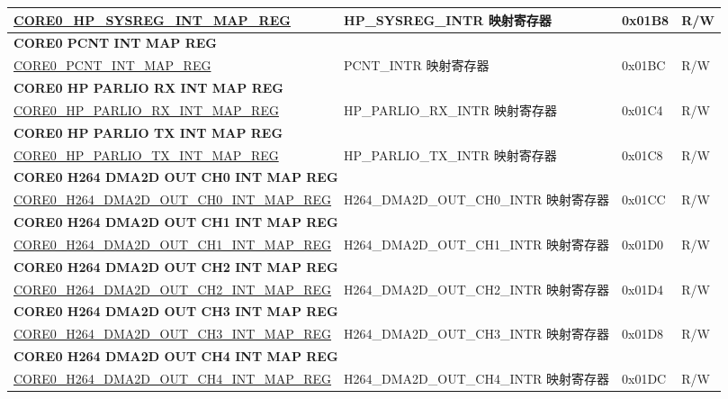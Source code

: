 \begin{longtable}{ | p{8.7cm} | p{6.2cm} | p{1.3cm} | p{1cm} | }
\hyperref[regdesc:CORE0HPSYSREGINTMAPREG]{CORE0\_HP\_SYSREG\_INT\_MAP\_REG} & HP\_SYSREG\_INTR 映射寄存器 & 0x01B8 & R/W \\ \hline
\multicolumn{4}{|l|}{\textbf{CORE0 PCNT INT MAP REG}} \\ \hline
\hyperref[regdesc:CORE0PCNTINTMAPREG]{CORE0\_PCNT\_INT\_MAP\_REG} & PCNT\_INTR 映射寄存器 & 0x01BC & R/W \\ \hline
\multicolumn{4}{|l|}{\textbf{CORE0 HP PARLIO RX INT MAP REG}} \\ \hline
\hyperref[regdesc:CORE0HPPARLIORXINTMAPREG]{CORE0\_HP\_PARLIO\_RX\_INT\_MAP\_REG} & HP\_PARLIO\_RX\_INTR 映射寄存器 & 0x01C4 & R/W \\ \hline
\multicolumn{4}{|l|}{\textbf{CORE0 HP PARLIO TX INT MAP REG}} \\ \hline
\hyperref[regdesc:CORE0HPPARLIOTXINTMAPREG]{CORE0\_HP\_PARLIO\_TX\_INT\_MAP\_REG} & HP\_PARLIO\_TX\_INTR 映射寄存器 & 0x01C8 & R/W \\ \hline
\multicolumn{4}{|l|}{\textbf{CORE0 H264 DMA2D OUT CH0 INT MAP REG}} \\ \hline
\hyperref[regdesc:CORE0H264DMA2DOUTCH0INTMAPREG]{CORE0\_H264\_DMA2D\_OUT\_CH0\_INT\_MAP\_REG} & H264\_DMA2D\_OUT\_CH0\_INTR 映射寄存器 & 0x01CC & R/W \\ \hline
\multicolumn{4}{|l|}{\textbf{CORE0 H264 DMA2D OUT CH1 INT MAP REG}} \\ \hline
\hyperref[regdesc:CORE0H264DMA2DOUTCH1INTMAPREG]{CORE0\_H264\_DMA2D\_OUT\_CH1\_INT\_MAP\_REG} & H264\_DMA2D\_OUT\_CH1\_INTR 映射寄存器 & 0x01D0 & R/W \\ \hline
\multicolumn{4}{|l|}{\textbf{CORE0 H264 DMA2D OUT CH2 INT MAP REG}} \\ \hline
\hyperref[regdesc:CORE0H264DMA2DOUTCH2INTMAPREG]{CORE0\_H264\_DMA2D\_OUT\_CH2\_INT\_MAP\_REG} & H264\_DMA2D\_OUT\_CH2\_INTR 映射寄存器 & 0x01D4 & R/W \\ \hline
\multicolumn{4}{|l|}{\textbf{CORE0 H264 DMA2D OUT CH3 INT MAP REG}} \\ \hline
\hyperref[regdesc:CORE0H264DMA2DOUTCH3INTMAPREG]{CORE0\_H264\_DMA2D\_OUT\_CH3\_INT\_MAP\_REG} & H264\_DMA2D\_OUT\_CH3\_INTR 映射寄存器 & 0x01D8 & R/W \\ \hline
\multicolumn{4}{|l|}{\textbf{CORE0 H264 DMA2D OUT CH4 INT MAP REG}} \\ \hline
\hyperref[regdesc:CORE0H264DMA2DOUTCH4INTMAPREG]{CORE0\_H264\_DMA2D\_OUT\_CH4\_INT\_MAP\_REG} & H264\_DMA2D\_OUT\_CH4\_INTR 映射寄存器 & 0x01DC & R/W \\ \hline

\end{longtable}
